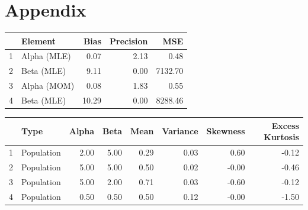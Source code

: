 \documentclass{article}\usepackage[]{graphicx}\usepackage[]{xcolor}
\begin{document}
\section{Appendix}
\begin{table}[ht]
\centering
\begin{tabular}{rlrrr}
  \hline
 & Element & Bias & Precision & MSE \\ 
  \hline
1 & Alpha (MLE) & 0.07 & 2.13 & 0.48 \\ 
  2 & Beta (MLE) & 9.11 & 0.00 & 7132.70 \\ 
  3 & Alpha (MOM) & 0.08 & 1.83 & 0.55 \\ 
  4 & Beta (MLE) & 10.29 & 0.00 & 8288.46 \\ 
   \hline
\end{tabular}
\end{table}
\begin{table}[ht]
\centering
\begin{tabular}{rlrrrrrr}
  \hline
 & Type & Alpha & Beta & Mean & Variance & Skewness & Excess Kurtosis \\ 
  \hline
1 & Population & 2.00 & 5.00 & 0.29 & 0.03 & 0.60 & -0.12 \\ 
  2 & Population & 5.00 & 5.00 & 0.50 & 0.02 & -0.00 & -0.46 \\ 
  3 & Population & 5.00 & 2.00 & 0.71 & 0.03 & -0.60 & -0.12 \\ 
  4 & Population & 0.50 & 0.50 & 0.50 & 0.12 & -0.00 & -1.50 \\ 
   \hline
\end{tabular}
\end{table}
\end{document}
